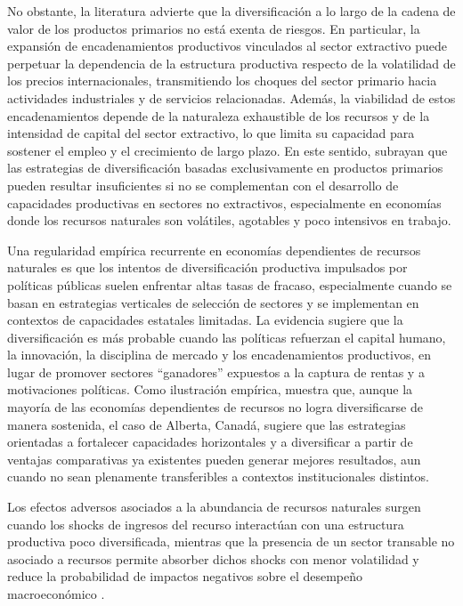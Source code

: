 \documentclass[../../PTFM.tex]{subfiles}
\begin{document}
	No obstante, la literatura advierte que la diversificación a lo largo de la cadena de valor de los productos primarios no está exenta de riesgos. En particular, la expansión de encadenamientos productivos vinculados al sector extractivo puede perpetuar la dependencia de la estructura productiva respecto de la volatilidad de los precios internacionales, transmitiendo los choques del sector primario hacia actividades industriales y de servicios relacionadas. Además, la viabilidad de estos encadenamientos depende de la naturaleza exhaustible de los recursos y de la intensidad de capital del sector extractivo, lo que limita su capacidad para sostener el empleo y el crecimiento de largo plazo. En este sentido, \textcite{Lebdioui2019} subrayan que las estrategias de diversificación basadas exclusivamente en productos primarios pueden resultar insuficientes si no se complementan con el desarrollo de capacidades productivas en sectores no extractivos, especialmente en economías donde los recursos naturales son volátiles, agotables y poco intensivos en trabajo.
	
	Una regularidad empírica recurrente en economías dependientes de recursos naturales es que los intentos de diversificación productiva impulsados por políticas públicas suelen enfrentar altas tasas de fracaso, especialmente cuando se basan en estrategias verticales de selección de sectores y se implementan en contextos de capacidades estatales limitadas. La evidencia sugiere que la diversificación es más probable cuando las políticas refuerzan el capital humano, la innovación, la disciplina de mercado y los encadenamientos productivos, en lugar de promover sectores “ganadores” expuestos a la captura de rentas y a motivaciones políticas. Como ilustración empírica, \textcite{Howie2018} muestra que, aunque la mayoría de las economías dependientes de recursos no logra diversificarse de manera sostenida, el caso de Alberta, Canadá, sugiere que las estrategias orientadas a fortalecer capacidades horizontales y a diversificar a partir de ventajas comparativas ya existentes pueden generar mejores resultados, aun cuando no sean plenamente transferibles a contextos institucionales distintos.
	
	Los efectos adversos asociados a la abundancia de recursos naturales surgen cuando los shocks de ingresos del recurso interactúan con una estructura productiva poco diversificada, mientras que la presencia de un sector transable no asociado a recursos permite absorber dichos shocks con menor volatilidad y reduce la probabilidad de impactos negativos sobre el desempeño macroeconómico \parencite{Hausmann2002}.
	
\end{document}
